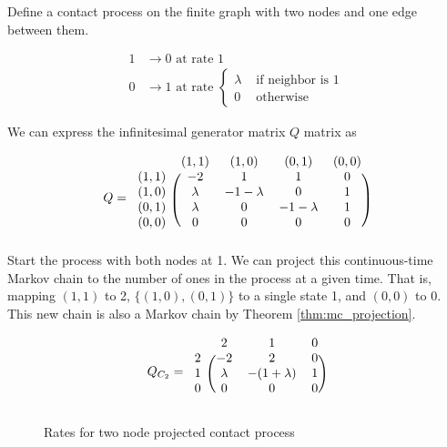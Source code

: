 \documentclass{article}
\theoremstyle{plain}
\theoremstyle{definition}
\theoremstyle{remark}
\numberwithin{equation}{section}
\begin{document}
Define a contact process on the finite graph with two nodes and one edge between them.

\begin{align}
    1 &\to 0 \text{ at rate } 1\\
    0 &\to 1 \text{ at rate } \begin{cases}
        \lambda & \text{ if neighbor is 1}\\
        0 & \text{ otherwise}
    \end{cases}
\end{align}

We can express the infinitesimal generator matrix $Q$ matrix as

$$
Q = \begin{blockarray}{ccccc}
    & (1,1) & (1,0) & (0,1) & (0,0)\\
    \begin{block}{c(cccc)}
        (1,1) & -2 & 1 & 1 & 0\\
        (1,0) & \lambda & - 1 - \lambda & 0 & 1\\
        (0,1) & \lambda & 0 & - 1 - \lambda & 1\\
        (0,0) & 0 & 0 & 0 & 0\\
    \end{block}
\end{blockarray}
$$
Start the process with both nodes at 1.
We can project this continuous-time Markov chain to the number of ones in the process at a given time.
That is, mapping $(1,1)$ to 2, $\{(1,0),(0,1)\}$ to a single state 1, and $(0,0)$ to 0.
This new chain is also a Markov chain by Theorem \ref{thm:mc_projection}.

$$
Q_{C_2} = \begin{blockarray}{cccc}
    & 2 & 1 & 0\\
    \begin{block}{c(ccc)}
        2 & -2 & 2 & 0\\
        1 & \lambda & - (1 + \lambda) & 1\\
        0 & 0 & 0 & 0\\
    \end{block}
\end{blockarray}
$$

\begin{figure}[h]
    \centering
    \caption{Rates for two node projected contact process}
    \label{fig:rates_mc_two_contact}
\end{figure}
\end{document}
